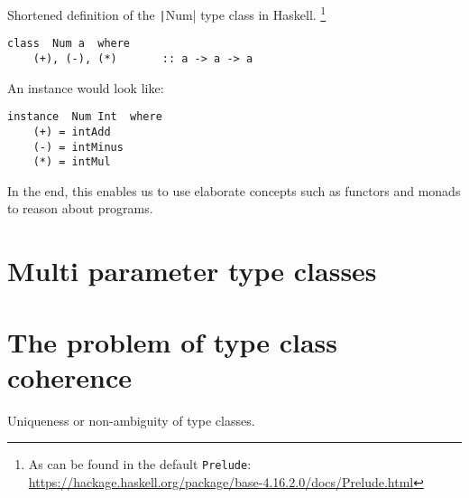 Shortened definition of the \texttt|Num| type class in Haskell.
\footnote{As can be found in the default \texttt{Prelude}: \url{https://hackage.haskell.org/package/base-4.16.2.0/docs/Prelude.html}}

\begin{verbatim}
class  Num a  where
    (+), (-), (*)       :: a -> a -> a
\end{verbatim}

An instance would look like:

\begin{verbatim}
instance  Num Int  where
    (+) = intAdd
    (-) = intMinus
    (*) = intMul
\end{verbatim}






In the end, this enables us to use elaborate concepts such as functors and monads to reason about programs.

\cite{wadlerblott}

\section{Multi parameter type classes}\label{sec:multiparam}

\section{The problem of type class coherence}\label{sec:coherence}

Uniqueness or non-ambiguity of type classes.
